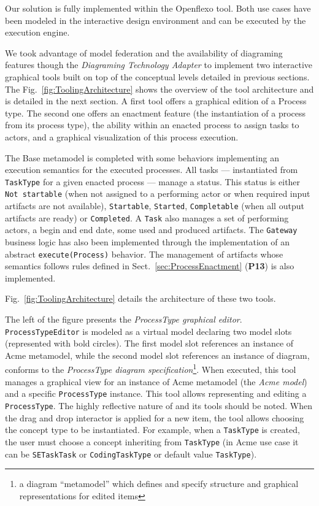 Our solution is fully implemented within the Openflexo tool. Both use cases
have been modeled in the interactive design environment and can be executed by
the \FML execution engine.


We took advantage of model federation and the availability of diagraming
features though the \textit{Diagraming Technology Adapter} to implement two
interactive graphical tools built on top of the conceptual levels detailed in
previous sections. The Fig.~\ref{fig:ToolingArchitecture} shows the overview of
the tool architecture and is detailed in the next section. A first tool offers
a graphical edition of a Process type. The second one offers an enactment
feature (the instantiation of a process from its process type), the ability
within an enacted process to assign tasks to actors, and a graphical
visualization of this process execution.


The Base metamodel is completed with some behaviors implementing an execution
semantics for the executed processes. All tasks --- instantiated from
\texttt{TaskType} for a given enacted process --- manage a status. This status
is either \texttt{Not startable} (when not assigned to a performing actor or
when required input artifacts are not available), \texttt{Startable},
\texttt{Started}, \texttt{Completable} (when all output artifacts are ready) or
\texttt{Completed}. A \texttt{Task} also manages a set of performing actors, a
begin and end date, some used and produced artifacts. The \texttt{Gateway}
business logic has also been implemented through the implementation of an
abstract \texttt{execute(Process)} behavior. The management of artifacts whose
semantics follows rules defined in Sect.~\ref{sec:ProcessEnactment}
(\textbf{P13}) is also implemented.

Fig.~\ref{fig:ToolingArchitecture} details the architecture of these two tools.

The left of the figure presents the \textit{ProcessType graphical editor}.
\texttt{ProcessTypeEditor} is modeled as a virtual model declaring two model
slots (represented with bold circles). The first model slot references an
instance of Acme metamodel, while the second model slot references an instance
of diagram, conforms to the \textit{ProcessType diagram
specification}\footnote{a diagram \enquote{metamodel} which defines and specify
structure and graphical representations for edited items}. When executed, this
tool manages a graphical view for an instance of Acme metamodel (the
\textit{Acme model}) and a specific \texttt{ProcessType} instance. This tool
allows representing and editing a \texttt{ProcessType}. The highly reflective
nature of \FML and its tools should be noted. When the drag and drop
interactor is applied for a new item, the tool allows choosing the concept type
to be instantiated. For example, when a \texttt{TaskType} is created, the user
must choose a concept inheriting from \texttt{TaskType} (in Acme use case it
can be \texttt{SETaskTask} or \texttt{CodingTaskType} or default value
\texttt{TaskType}).

